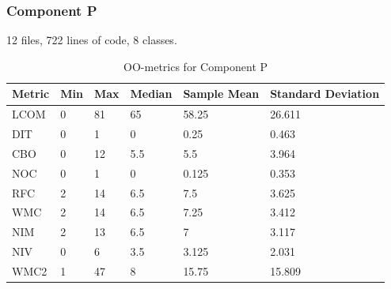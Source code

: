 \subsubsection{Component P}
12 files, 722 lines of code, 8 classes.



\begin{table}[]
\centering
\caption{OO-metrics for Component P}
\label{tab:oometrics-proc}
\begin{tabular}{|l|l|l|l|l|l|}
\hline
\textbf{Metric} & \textbf{Min} & \textbf{Max} & \textbf{Median} & \textbf{Sample Mean} & \textbf{Standard Deviation} \\ \hline
LCOM            & 0            & 81           & 65              & 58.25                & 26.611                      \\ \hline
DIT             & 0            & 1            & 0               & 0.25                 & 0.463                       \\ \hline
CBO             & 0            & 12           & 5.5             & 5.5                  & 3.964                       \\ \hline
NOC             & 0            & 1            & 0               & 0.125                & 0.353                       \\ \hline
RFC             & 2            & 14           & 6.5             & 7.5                  & 3.625                       \\ \hline
WMC             & 2            & 14           & 6.5             & 7.25                 & 3.412                       \\ \hline
NIM             & 2            & 13           & 6.5             & 7                    & 3.117                       \\ \hline
NIV             & 0            & 6            & 3.5             & 3.125                & 2.031                       \\ \hline
WMC2            & 1            & 47           & 8               & 15.75                & 15.809                      \\ \hline
\end{tabular}
\end{table}



